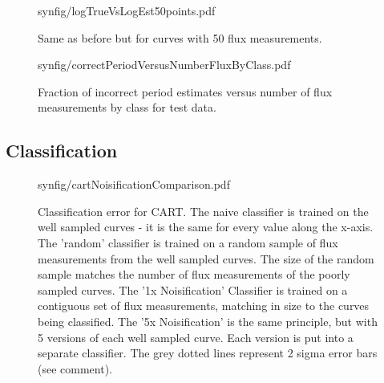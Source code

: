 \documentclass[10pt]{article}
\begin{document}
\begin{figure}[H]
  \begin{center}
    \begin{includegraphics}[height=4in,width=4in]{synfig/logTrueVsLogEst50points.pdf}
      \caption{Same as before but for curves with 50 flux measurements.\label{fig:logTrueVsLogEst50pointsSyn}}
    \end{includegraphics}
  \end{center}
\end{figure}


\begin{figure}[H]
  \begin{center}
    \begin{includegraphics}[height=4in,width=4in]{synfig/correctPeriodVersusNumberFluxByClass.pdf}
      \caption{Fraction of incorrect period estimates versus number of flux measurements by class for test data.\label{fig:correctPeriodVersusNumberFluxByClass}}
    \end{includegraphics}
  \end{center}
\end{figure}




\subsection{Classification}

\begin{figure}[H]
  \begin{center}
    \begin{includegraphics}[height=4in,width=4in]{synfig/cartNoisificationComparison.pdf}
      \caption{Classification error for CART. The naive classifier is trained on the well sampled curves - it is the same for every value along the x-axis. The 'random' classifier is trained on a random sample of flux measurements from the well sampled curves. The size of the random sample matches the number of flux measurements of the poorly sampled curves. The '1x Noisification' Classifier is trained on a contiguous set of flux measurements, matching in size to the curves being classified. The '5x Noisification' is the same principle, but with 5 versions of each well sampled curve. Each version is put into a separate classifier. The grey dotted lines represent 2 sigma error bars (see comment).\label{fig:cartNoisificationComparisonSyn}}
    \end{includegraphics}
  \end{center}
\end{figure}
\end{document}
